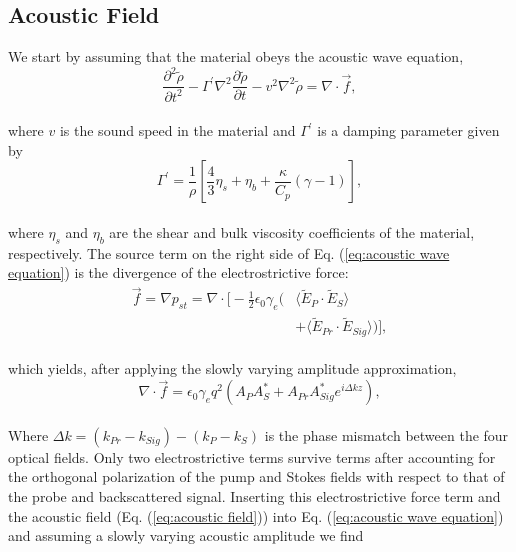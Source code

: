 \documentclass[%
  reprint,
  superscriptaddress,
  amsmath,amssymb,
  aps,
  prapplied,
]{revtex4-2}
\begin{document}
\subsection{Acoustic Field}\label{Coupled-Wave Equations:Acoustic Field}

We start by assuming that the material obeys the acoustic wave equation,
\\
\begin{equation}
    \frac{\partial^{2}\tilde{\rho}}{\partial t^{2}} - \Gamma^{\prime}\nabla^{2}\frac{\partial\tilde{\rho}}{\partial t} - v^{2}\nabla^{2}\tilde{\rho} = \nabla\cdot\vec{f},
    \label{eq:acoustic wave equation}
\end{equation}
\\
\noindent where $v$ is the sound speed in the material and $\Gamma^{\prime}$ is a damping parameter given by
\\
\begin{equation}
    \Gamma^{\prime} = \frac{1}{\rho}\left[\frac{4}{3}\eta_{s} + \eta_{b} + \frac{\kappa}{C_{p}}(\gamma - 1)\right],
\end{equation}
\\
\noindent where $\eta_{s}$ and $\eta_{b}$ are the shear and bulk viscosity coefficients of the material, respectively. The source term on the right side of Eq. (\ref{eq:acoustic wave equation}) is the divergence of the electrostrictive force:
\\
\begin{equation}
\begin{split}
    \vec{f} = \nabla p_{st} = \nabla \cdot \Bigg[-\frac{1}{2}\epsilon_{0}\gamma_{e}\Big(&\langle\tilde{E}_{P} \cdot \tilde{E}_{S}\rangle \\
    &+ \langle\tilde{E}_{Pr} \cdot \tilde{E}_{Sig}\rangle\Big)\Bigg],
\end{split}
\end{equation}
\\
which yields, after applying the slowly varying amplitude approximation,
\\
\begin{equation}
    \nabla\cdot\vec{f} = \epsilon_{0}\gamma_{e}q^{2}(A_{P}A_{S}^{*} + A_{Pr}A_{Sig}^{*}e^{i\Delta kz}),
\end{equation}
\\
Where $\Delta k = (k_{Pr} - k_{Sig}) - (k_{P} - k_{S})$ is the phase mismatch between the four optical fields. Only two electrostrictive terms survive terms after accounting for the orthogonal polarization of the pump and Stokes fields with respect to that of the probe and backscattered signal. Inserting this electrostrictive force term and the acoustic field (Eq. (\ref{eq:acoustic field})) into Eq. (\ref{eq:acoustic wave equation}) and assuming a slowly varying acoustic amplitude we find
\end{document}
